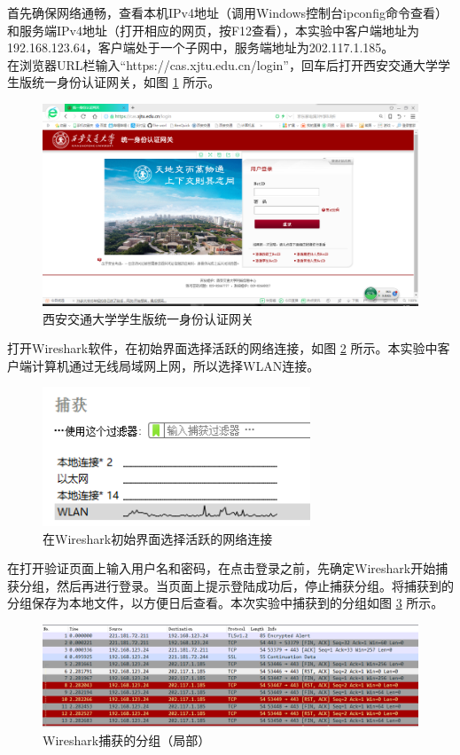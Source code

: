 \qquad
首先确保网络通畅，查看本机IPv4地址（调用Windows控制台ipconfig命令查看）和服务端IPv4地址（打开相应的网页，按F12查看），本实验中客户端地址为192.168.123.64，客户端处于一个子网中，服务端地址为202.117.1.185。\\
\qquad
在浏览器URL栏输入“https://cas.xjtu.edu.cn/login”，回车后打开西安交通大学学生版统一身份认证网关，如图 \ref{fig2} 所示。\\
\begin{figure}
	\centering
	\includegraphics[width=12cm]{image/XJTU-Certificate}
	\caption{西安交通大学学生版统一身份认证网关}
	\label{fig2}
\end{figure}
\qquad
打开Wireshark软件，在初始界面选择活跃的网络连接，如图 \ref{fig3} 所示。本实验中客户端计算机通过无线局域网上网，所以选择WLAN连接。\\
\begin{figure}
	\centering
	\includegraphics[width=8cm]{image/Wireshark-1}
	\caption{在Wireshark初始界面选择活跃的网络连接}
	\label{fig3}
\end{figure}
\qquad
在打开验证页面上输入用户名和密码，在点击登录之前，先确定Wireshark开始捕获分组，然后再进行登录。当页面上提示登陆成功后，停止捕获分组。将捕获到的分组保存为本地文件，以方便日后查看。本次实验中捕获到的分组如图 \ref{fig4} 所示。\\
\begin{figure}
	\centering
	\includegraphics[width=12cm]{image/Wireshark-2}
	\caption{Wireshark捕获的分组（局部）}
	\label{fig4}
\end{figure}
